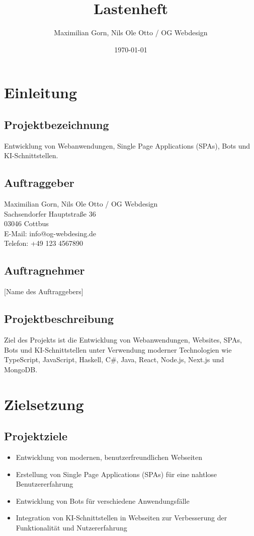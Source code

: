 \documentclass[a4paper,12pt]{article}
\begin{document}
\title{Lastenheft}
\author{Maximilian Gorn, Nils Ole Otto / OG Webdesign}
\date{\today}
\maketitle

\tableofcontents
\newpage

\section{Einleitung}

\subsection{Projektbezeichnung}
Entwicklung von Webanwendungen, Single Page Applications (SPAs), Bots und KI-Schnittstellen.

\subsection{Auftraggeber}
Maximilian Gorn, Nils Ole Otto / OG Webdesign \\
Sachsendorfer Hauptstraße 36 \\
03046 Cottbus \\
E-Mail: info@og-webdesing.de \\
Telefon: +49 123 4567890

\subsection{Auftragnehmer}
[Name des Auftraggebers]

\subsection{Projektbeschreibung}
Ziel des Projekts ist die Entwicklung von Webanwendungen, Websites, SPAs, Bots und KI-Schnittstellen unter Verwendung moderner Technologien wie TypeScript, JavaScript, Haskell, C\#, Java, React, Node.js, Next.js und MongoDB.

\section{Zielsetzung}

\subsection{Projektziele}
\begin{itemize}
    \item Entwicklung von modernen, benutzerfreundlichen Webseiten
    \item Erstellung von Single Page Applications (SPAs) für eine nahtlose Benutzererfahrung
    \item Entwicklung von Bots für verschiedene Anwendungsfälle
    \item Integration von KI-Schnittstellen in Webseiten zur Verbesserung der Funktionalität und Nutzererfahrung
\end{itemize}
\end{document}
